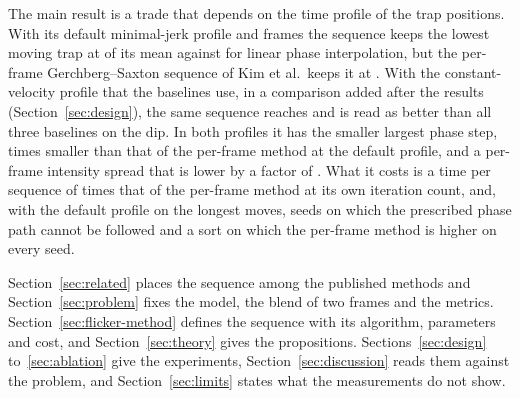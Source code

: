 The main result is a trade that depends on the time profile of the trap positions. With its default minimal-jerk profile and \parFrames{} frames the sequence keeps the lowest moving trap at \accBTransMean{} of its mean against \accLpiTransMean{} for linear phase interpolation, but the per-frame Gerchberg--Saxton sequence of Kim et al.\ keeps it at \accKimFiveTransMean{}. With the constant-velocity profile that the baselines use, in a comparison added after the results (Section~\ref{sec:design}), the same sequence reaches \ablTLinearMean{} and is read as better than all three baselines on the dip. In both profiles it has the smaller largest phase step, \stepRatio{} times smaller than that of the per-frame method at the default profile, and a per-frame intensity spread that is lower by a factor of \sigmaRatio{}. What it costs is a time per sequence of \secRatio{} times that of the per-frame method at its own iteration count, and, with the default profile on the longest moves, seeds on which the prescribed phase path cannot be followed and a sort on which the per-frame method is higher on every seed.

Section~\ref{sec:related} places the sequence among the published methods and Section~\ref{sec:problem} fixes the model, the blend of two frames and the metrics. Section~\ref{sec:flicker-method} defines the sequence with its algorithm, parameters and cost, and Section~\ref{sec:theory} gives the propositions. Sections~\ref{sec:design} to~\ref{sec:ablation} give the experiments, Section~\ref{sec:discussion} reads them against the problem, and Section~\ref{sec:limits} states what the measurements do not show.

